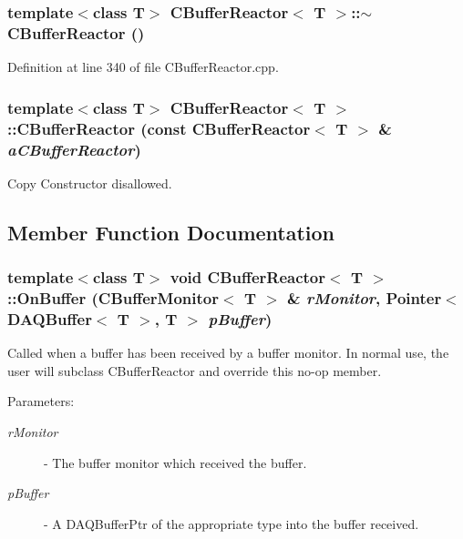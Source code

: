 \subsubsection{\setlength{\rightskip}{0pt plus 5cm}template$<$class T$>$ CBuffer\-Reactor$<$ T $>$::$\sim$CBuffer\-Reactor ()}\label{classCBufferReactor_a3}




Definition at line 340 of file CBuffer\-Reactor.cpp.
\subsubsection{\setlength{\rightskip}{0pt plus 5cm}template$<$class T$>$ CBuffer\-Reactor$<$ T $>$::CBuffer\-Reactor (const CBuffer\-Reactor$<$ T $>$ \& {\em a\-CBuffer\-Reactor})\hspace{0.3cm}{\tt  [private]}}\label{classCBufferReactor_c0}


Copy Constructor disallowed.



\subsection{Member Function Documentation}
\subsubsection{\setlength{\rightskip}{0pt plus 5cm}template$<$class T$>$ void CBuffer\-Reactor$<$ T $>$::On\-Buffer ({\bf CBuffer\-Monitor}$<$ T $>$ \& {\em r\-Monitor}, Pointer$<$ DAQBuffer$<$ T $>$, T $>$ {\em p\-Buffer})\hspace{0.3cm}{\tt  [virtual]}}\label{classCBufferReactor_a6}


Called when a buffer has been received by a buffer monitor. In normal use, the user will subclass CBuffer\-Reactor and override this no-op member. \begin{Desc}
\item[Parameters: ]\par
\begin{description}
\item[{\em 
r\-Monitor}]- The buffer monitor which received the buffer. \item[{\em 
p\-Buffer}]- A DAQBuffer\-Ptr of the appropriate type into the buffer received. \end{description}
\end{Desc}


